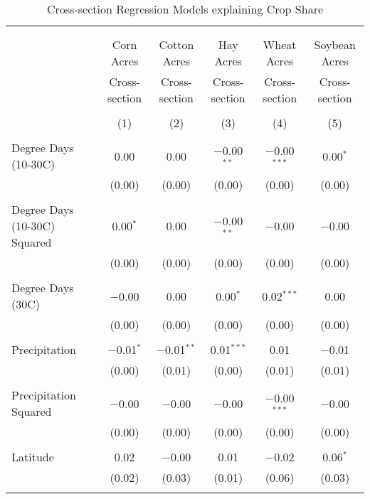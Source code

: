 \documentclass[10pt]{article}
\begin{document}
\newpage
\begin{table}[!htbp] \centering 
  \caption{Cross-section Regression Models explaining Crop Share} 
  \label{} 
\footnotesize 
\begin{tabular}{@{\extracolsep{5pt}}lccccc} 
\\[-1.8ex]\hline 
\hline \\[-1.8ex] 
\\[-1.8ex] & Corn Acres & Cotton Acres & Hay Acres & Wheat Acres & Soybean Acres \\ 
 & Cross-section & Cross-section & Cross-section & Cross-section & Cross-section \\ 
\\[-1.8ex] & (1) & (2) & (3) & (4) & (5)\\ 
\hline \\[-1.8ex] 
 Degree Days (10-30C) & 0.00 & 0.00 & $-$0.00$^{**}$ & $-$0.00$^{***}$ & 0.00$^{*}$ \\ 
  & (0.00) & (0.00) & (0.00) & (0.00) & (0.00) \\ 
  & & & & & \\ 
 Degree Days (10-30C) Squared & 0.00$^{*}$ & 0.00 & $-$0.00$^{**}$ & $-$0.00 & $-$0.00 \\ 
  & (0.00) & (0.00) & (0.00) & (0.00) & (0.00) \\ 
  & & & & & \\ 
 Degree Days (30C) & $-$0.00 & 0.00 & 0.00$^{*}$ & 0.02$^{***}$ & 0.00 \\ 
  & (0.00) & (0.00) & (0.00) & (0.00) & (0.00) \\ 
  & & & & & \\ 
 Precipitation & $-$0.01$^{*}$ & $-$0.01$^{**}$ & 0.01$^{***}$ & 0.01 & $-$0.01 \\ 
  & (0.00) & (0.01) & (0.00) & (0.01) & (0.01) \\ 
  & & & & & \\ 
 Precipitation Squared & $-$0.00 & $-$0.00 & $-$0.00 & $-$0.00$^{***}$ & $-$0.00 \\ 
  & (0.00) & (0.00) & (0.00) & (0.00) & (0.00) \\ 
  & & & & & \\ 
 Latitude & 0.02 & $-$0.00 & 0.01 & $-$0.02 & 0.06$^{*}$ \\ 
  & (0.02) & (0.03) & (0.01) & (0.06) & (0.03) \\ 
  & & & & & \\ 

\end{tabular}
\end{table}
\end{document}
